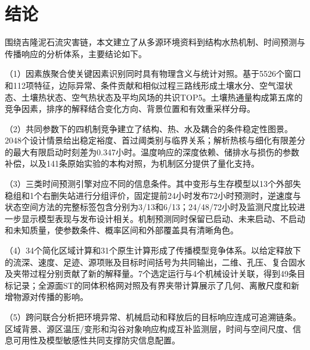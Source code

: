 \section{结论}\label{sec:conclusion}
围绕吉隆泥石流灾害链，本文建立了从多源环境资料到结构水热机制、时间预测与传播响应的分析体系，主要结论如下。

（1）因素族聚合使关键因素识别同时具有物理含义与统计对照。基于5526个窗口和112项特征，边际异常、条件贡献和相似过程三路线形成土壤水分、空气湿状态、土壤热状态、空气热状态及平均风场的共识TOP5。土壤热通量构成第五席的竞争因素，排序的解释结合变化方向、背景位置和有效重采样分母。

（2）共同参数下的四机制竞争建立了结构、热、水及耦合的条件稳定性图景。2048个设计情景给出稳定裕度、首过阈类别与临界关系；解析热核与细化有限差分的最大有限启动时刻差为0.347小时。温度响应的深度依赖、储排水与损伤的参数补偿，以及141条原始实验的本构对照，为机制区分提供了量化支持。

（3）三类时间预测引擎对应不同的信息条件。其中变形与生存模型以13个外部失稳组和1个右删失站进行分组评价，固定提前24小时发布72小时预测时，逆速度与状态空间方法的完整标签包含分别为3/13和6/13；24/48/72小时及监测尺度比较进一步显示模型表现与发布设计相关。机制预测同时保留已启动、未来启动、不启动和未知质量，使参数条件、概率区间和外部覆盖具有清晰角色。

（4）34个简化区域计算和31个原生计算形成了传播模型竞争体系。以给定释放下的流深、速度、足迹、源项账及目标时间括号为共同输出，二维、孔压、复合固水及夹带过程分别贡献了新的解释量。7个选定运行与4个机械设计关联，得到49条目标记录；全源面ST的同体积格网对照及有界夹带计算展示了几何、离散尺度和新增物源对传播的影响。

（5）跨问联合分析把环境异常、机械启动和释放后的目标响应连成可追溯链条。区域背景、源区温压/变形和沟谷对象响应构成互补监测层，时间与空间尺度、信息可用性及模型敏感性共同支撑防灾信息配置。
\AIcredit
